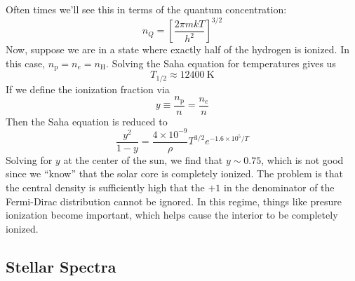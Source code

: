 \documentclass[10pt]{article}
\numberwithin{equation}{section}
\begin{document}
    Often times we'll see this in terms of the quantum
      concentration:
    \begin{equation}
      \label{eq:225}
      n_Q=\left[\frac{2\pi mkT}{h^2}\right]^{3/2}
    \end{equation}
    Now, suppose we are in a state where exactly half of the hydrogen
    is ionized. In this case,
    $n_{\mathrm{p}}=n_e=n_\mathrm{H}$. Solving the Saha equation for
    temperatures gives us
    \begin{equation}
      \label{eq:209}
      T_{1/2}\approx 12400\ \mathrm{K}
    \end{equation}
    If we define the ionization fraction via
    \begin{equation}
      \label{eq:210}
      y\equiv \frac{n_\mathrm{p}}{n}=\frac{n_e}{n}
    \end{equation}
    Then the Saha equation is reduced to
    \begin{equation}
      \label{eq:211}
      \boxed{\frac{y^2}{1-y}=\frac{4\times 10^{-9}}{\rho}T^{3/2}e^
{-1.6\times 10^5/T}}
    \end{equation}
    Solving for $y$ at the center of the sun, we find that $y\sim
    0.75$, which is not good since we ``know'' that the solar core is
    completely ionized. The problem is that the central density is
    sufficiently high that the $+1$ in the denominator of the
    Fermi-Dirac distribution cannot be ignored. In this regime, things
    like presure ionization become important, which helps cause the
    interior to be completely ionized.

    \subsection{Stellar Spectra}
    \label{sec:stellar-spectra}
\end{document}
